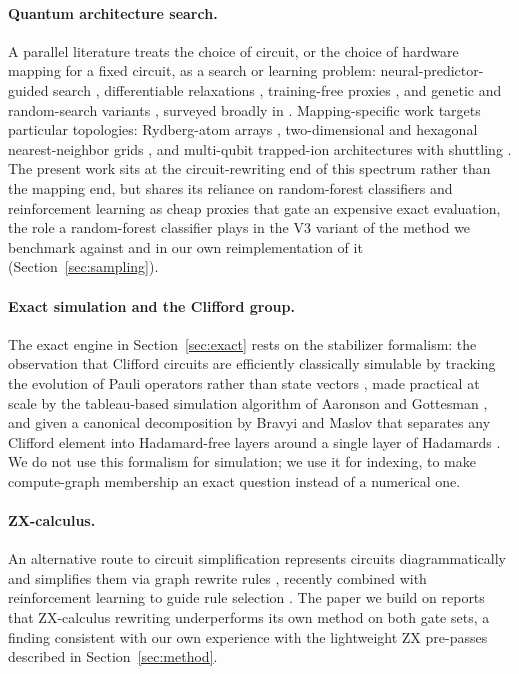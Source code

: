 \documentclass[11pt]{article}
\begin{document}
\paragraph{Quantum architecture search.} A parallel literature treats the
choice of circuit, or the choice of hardware mapping for a fixed circuit,
as a search or learning problem: neural-predictor-guided search
\cite{Zhang2021NeuralPredictorQAS}, differentiable relaxations
\cite{Zhang2022DifferentiableQAS}, training-free proxies
\cite{He2024TrainingFreeQAS}, and genetic and random-search variants
\cite{Rasconi2019GeneticCompilation,Ashhab2024RandomSearch}, surveyed
broadly in \cite{Martyniuk2024QASSurvey,Zhu2023QASSurvey}. Mapping-specific
work targets particular topologies: Rydberg-atom arrays
\cite{Brandhofer2021Rydberg}, two-dimensional and hexagonal nearest-neighbor
grids \cite{Datta2022_2DMapping,Datta2022_HexMapping}, and multi-qubit
trapped-ion architectures with shuttling \cite{Murali2020TrappedIon}. The
present work sits at the circuit-rewriting end of this spectrum rather
than the mapping end, but shares its reliance on random-forest classifiers
\cite{Breiman2001RandomForests} and reinforcement learning
\cite{Wauters2020RLOptimization} as cheap proxies that gate an expensive
exact evaluation, the role a random-forest classifier plays in the V3
variant of the method we benchmark against and in our own reimplementation
of it (Section~\ref{sec:sampling}).

\paragraph{Exact simulation and the Clifford group.} The exact engine in
Section~\ref{sec:exact} rests on the stabilizer formalism: the observation
that Clifford circuits are efficiently classically simulable by tracking
the evolution of Pauli operators rather than state vectors
\cite{Gottesman1998Heisenberg}, made practical at scale by the
tableau-based simulation algorithm of Aaronson and Gottesman
\cite{AaronsonGottesman2004}, and given a canonical decomposition by
Bravyi and Maslov that separates any Clifford element into Hadamard-free
layers around a single layer of Hadamards \cite{BravyiMaslov2021Clifford}.
We do not use this formalism for simulation; we use it for indexing, to
make compute-graph membership an exact question instead of a numerical
one.

\paragraph{ZX-calculus.} An alternative route to circuit simplification
represents circuits diagrammatically and simplifies them via graph
rewrite rules \cite{VandeWetering2020ZX}, recently combined with
reinforcement learning to guide rule selection \cite{Riu2024RLZX}. The
paper we build on reports that ZX-calculus rewriting underperforms its own
method on both gate sets, a finding consistent with our own experience
with the lightweight ZX pre-passes described in
Section~\ref{sec:method}.
\end{document}

